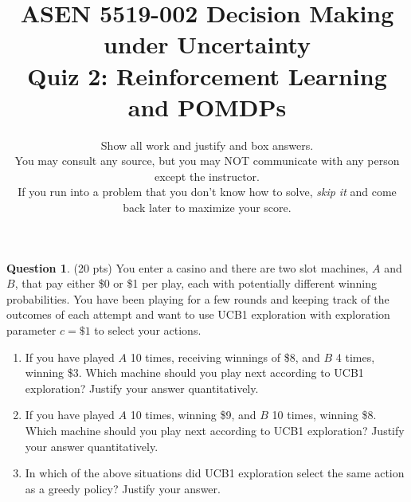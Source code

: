 \documentclass{article}
\title{ASEN 5519-002 Decision Making under Uncertainty\\
       Quiz 2: Reinforcement Learning and POMDPs}
\date{\small Show all work and justify and box answers.\\
You may consult any source, but you may NOT communicate with any person except the instructor.\\
If you run into a problem that you don't know how to solve, \emph{skip it} and come back later to maximize your score.
}
\theoremstyle{definition}
\newtheorem{question}[thm]{Question}
\begin{document}
\maketitle

\begin{question} (20 pts)
    You enter a casino and there are two slot machines, $A$ and $B$, that pay either \$0 or \$1 per play, each with potentially different winning probabilities. You have been playing for a few rounds and keeping track of the outcomes of each attempt and want to use UCB1 exploration with exploration parameter $c=\$1$ to select your actions.
    \begin{enumerate}[label=\alph*)]
        \item If you have played $A$ 10 times, receiving winnings of \$8, and $B$ 4 times, winning \$3. Which machine should you play next according to UCB1 exploration? Justify your answer quantitatively.
        \item If you have played $A$ 10 times, winning \$9, and $B$ 10 times, winning \$8. Which machine should you play next according to UCB1 exploration? Justify your answer quantitatively.
        \item In which of the above situations did UCB1 exploration select the same action as a greedy policy? Justify your answer.
    \end{enumerate}
\end{question}
\end{document}

